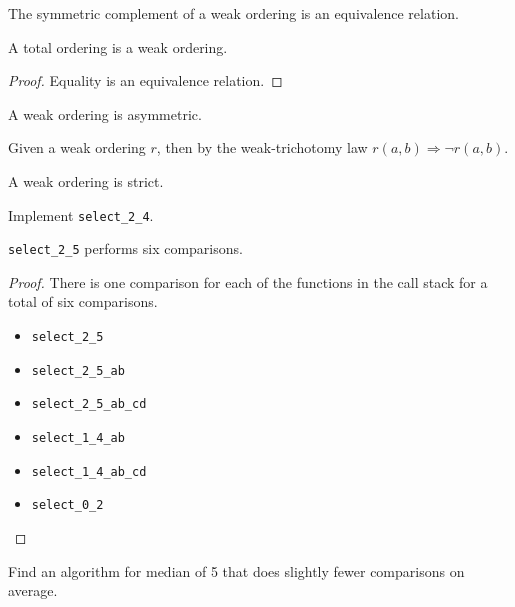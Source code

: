 \begin{lemma}
	The symmetric complement of a weak ordering is an equivalence relation.
\end{lemma}

\begin{lemma}
	A total ordering is a weak ordering.
\end{lemma}

\begin{proof}
	Equality is an equivalence relation.
\end{proof}

\begin{lemma}
	A weak ordering is asymmetric.
\end{lemma}

\begin{lemma}
	Given a weak ordering $r$, then by the weak-trichotomy law
	$r(a, b) \Rightarrow \lnot r(a, b)$.
\end{lemma}

\begin{lemma}
	A weak ordering is strict.
\end{lemma}

\begin{exercise}
	Implement \verb|select_2_4|.
\end{exercise}



\begin{lemma}
	\verb|select_2_5| performs six comparisons.
\end{lemma}

\begin{proof}
	There is one comparison for each of the functions in the call stack for a
	total of six comparisons.
	\begin{itemize}
		\item \verb|select_2_5|
		\item \verb|select_2_5_ab|
		\item \verb|select_2_5_ab_cd|
		\item \verb|select_1_4_ab|
		\item \verb|select_1_4_ab_cd|
		\item \verb|select_0_2|
	\end{itemize}
\end{proof}

\begin{exercise}
	Find an algorithm for median of 5 that does slightly fewer comparisons
	on average.
\end{exercise}

